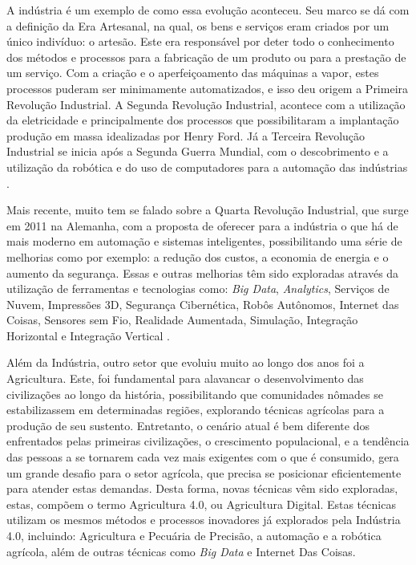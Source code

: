 \documentclass[12pt]{article}
\begin{document}
A indústria é um exemplo de como essa evolução aconteceu. Seu marco se dá com a definição da Era Artesanal, na qual, os bens e serviços eram criados por um único indivíduo: o artesão. Este era responsável por deter todo o conhecimento dos métodos e processos para a fabricação de um produto ou para a prestação de um serviço. Com a criação e o aperfeiçoamento das máquinas a vapor, estes processos puderam ser minimamente automatizados, e isso deu origem a Primeira Revolução Industrial. A Segunda Revolução Industrial, acontece com a utilização da eletricidade e principalmente dos processos que possibilitaram a implantação produção em massa idealizadas por Henry Ford. Já a Terceira Revolução Industrial se inicia após a Segunda Guerra Mundial, com o descobrimento e a utilização da robótica e do uso de computadores para a automação das indústrias \cite{industria-40}.

Mais recente, muito tem se falado sobre a Quarta Revolução Industrial, que surge em 2011 na Alemanha, com a proposta de oferecer para a indústria o que há de mais moderno em automação e sistemas inteligentes, possibilitando uma série de melhorias como por exemplo: a redução dos custos, a economia de energia e o aumento da segurança. Essas e outras melhorias têm sido exploradas através da utilização de ferramentas e tecnologias como: \textit{Big Data}, \textit{Analytics}, Serviços de Nuvem, Impressões 3D, Segurança Cibernética, Robôs Autônomos, Internet das Coisas, Sensores sem Fio, Realidade Aumentada, Simulação, Integração Horizontal e Integração Vertical \cite{industria-40}.

Além da Indústria, outro setor que evoluiu muito ao longo dos anos foi a Agricultura. Este, foi fundamental para alavancar o desenvolvimento das civilizações ao longo da história, possibilitando que comunidades nômades se estabilizassem em determinadas regiões, explorando técnicas agrícolas para a produção de seu sustento. Entretanto, o cenário atual é bem diferente dos enfrentados pelas primeiras civilizações, o crescimento populacional, e a tendência das pessoas a se tornarem cada vez mais exigentes com o que é consumido, gera um grande desafio para o setor agrícola, que precisa se posicionar eficientemente para atender estas demandas. Desta forma, novas técnicas vêm sido exploradas, estas, compõem o termo Agricultura 4.0, ou Agricultura Digital. Estas técnicas utilizam os mesmos métodos e processos inovadores já explorados pela Indústria 4.0, incluindo: Agricultura e Pecuária de Precisão, a automação e a robótica agrícola, além de outras técnicas como \textit{Big Data} e Internet Das Coisas. \cite{agricultura-40}
\end{document}
